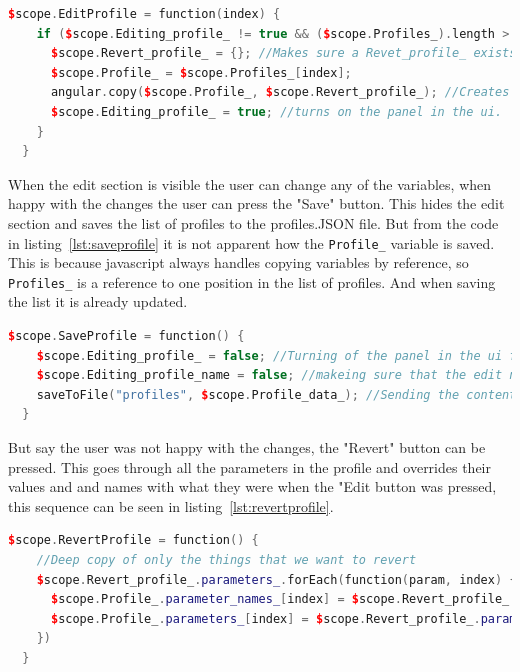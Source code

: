 \begin{lstlisting}[caption = {EditProfile function in editParam.js}, captionpos=b, label={lst:editprofile}, language=C++,firstnumber=1]
$scope.EditProfile = function(index) {
    if ($scope.Editing_profile_ != true && ($scope.Profiles_).length > 0) { //Makes sure that there is something to edit!
      $scope.Revert_profile_ = {}; //Makes sure a Revet_profile_ exists
      $scope.Profile_ = $scope.Profiles_[index];
      angular.copy($scope.Profile_, $scope.Revert_profile_); //Creates a copy of Profile_ into Revert_profile_ instead of reference
      $scope.Editing_profile_ = true; //turns on the panel in the ui.
    }
  }
\end{lstlisting}

When the edit section is visible the user can change any of the variables, when happy with the changes the user can press the "Save" button. This hides the edit section and saves the list of profiles to the profiles.JSON file. But from the code in listing~\ref{lst:saveprofile} it is not apparent how the \texttt{Profile\_} variable is saved. This is because javascript always handles copying variables by reference, so \texttt{Profiles\_} is a reference to one position in the list of profiles. And when saving the list it is already updated.

\begin{lstlisting}[caption = {SaveProfile function in editParam.js}, captionpos=b, label={lst:saveprofile}, language=C++,firstnumber=1]
$scope.SaveProfile = function() {
    $scope.Editing_profile_ = false; //Turning of the panel in the ui for editing
    $scope.Editing_profile_name = false; //makeing sure that the edit name ui change is reset.
    saveToFile("profiles", $scope.Profile_data_); //Sending the content to the server to get saved.
  }
\end{lstlisting}

But say the user was not happy with the changes, the "Revert" button can be pressed. This goes through all the parameters in the profile and overrides their values and and names with what they were when the "Edit button was pressed, this sequence can be seen in listing~\ref{lst:revertprofile}.

\begin{lstlisting}[caption = {RevertProfile function in editParam.js}, captionpos=b, label={lst:revertprofile}, language=C++,firstnumber=1]
$scope.RevertProfile = function() {
    //Deep copy of only the things that we want to revert
    $scope.Revert_profile_.parameters_.forEach(function(param, index) {
      $scope.Profile_.parameter_names_[index] = $scope.Revert_profile_.parameter_names_[index];
      $scope.Profile_.parameters_[index] = $scope.Revert_profile_.parameters_[index];
    })
  }
\end{lstlisting}

